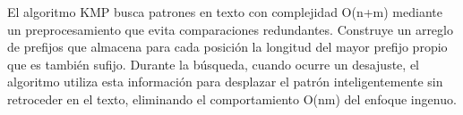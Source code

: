 \markdownRendererDocumentBegin
\markdownRendererSectionBegin
{}\markdownRendererInterblockSeparator
{}El algoritmo KMP busca patrones en texto con complejidad \markdownRendererDollarSign{}O(n+m)\markdownRendererDollarSign{} mediante un preprocesamiento que evita comparaciones redundantes. Construye un arreglo de prefijos que almacena para cada posición la longitud del mayor prefijo propio que es también sufijo. Durante la búsqueda, cuando ocurre un desajuste, el algoritmo utiliza esta información para desplazar el patrón inteligentemente sin retroceder en el texto, eliminando el comportamiento \markdownRendererDollarSign{}O(nm)\markdownRendererDollarSign{} del enfoque ingenuo.\markdownRendererParagraphSeparator
{}
\markdownRendererSectionEnd \markdownRendererDocumentEnd
